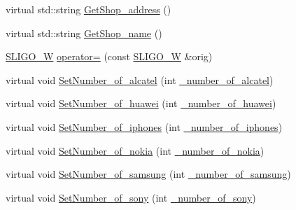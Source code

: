 \begin{DoxyCompactItemize}
virtual std\+::string \hyperlink{class_s_l_i_g_o___w_a66a2315d531231e34c5056e9bc917797_a66a2315d531231e34c5056e9bc917797}{Get\+Shop\+\_\+address} ()
\item 
virtual std\+::string \hyperlink{class_s_l_i_g_o___w_ae788518e30d9d311eb28f37da932367a_ae788518e30d9d311eb28f37da932367a}{Get\+Shop\+\_\+name} ()
\item 
\hyperlink{class_s_l_i_g_o___w}{S\+L\+I\+G\+O\+\_\+W} \hyperlink{class_s_l_i_g_o___w_a64051fdd5b3ebc47b0a74b42eb092c1b_a64051fdd5b3ebc47b0a74b42eb092c1b}{operator=} (const \hyperlink{class_s_l_i_g_o___w}{S\+L\+I\+G\+O\+\_\+W} \&orig)
\item 
virtual void \hyperlink{class_s_l_i_g_o___w_abbd14fe78b2f5881020630842194aa5b_abbd14fe78b2f5881020630842194aa5b}{Set\+Number\+\_\+of\+\_\+alcatel} (int \hyperlink{class_s_l_i_g_o___w_acbf32331901a3fc710c5c97d286b6fcf_acbf32331901a3fc710c5c97d286b6fcf}{\+\_\+number\+\_\+of\+\_\+alcatel})
\item 
virtual void \hyperlink{class_s_l_i_g_o___w_a3f770536e7ae43cba203b36b452bca76_a3f770536e7ae43cba203b36b452bca76}{Set\+Number\+\_\+of\+\_\+huawei} (int \hyperlink{class_s_l_i_g_o___w_af9ca2fb509b7b8ca9f1860ece827501f_af9ca2fb509b7b8ca9f1860ece827501f}{\+\_\+number\+\_\+of\+\_\+huawei})
\item 
virtual void \hyperlink{class_s_l_i_g_o___w_ad2f09386c9305c63a94ab171861eb3a9_ad2f09386c9305c63a94ab171861eb3a9}{Set\+Number\+\_\+of\+\_\+iphones} (int \hyperlink{class_s_l_i_g_o___w_aa958eed564796bb349d15bf2b2e3208d_aa958eed564796bb349d15bf2b2e3208d}{\+\_\+number\+\_\+of\+\_\+iphones})
\item 
virtual void \hyperlink{class_s_l_i_g_o___w_a2b748e4d815e0f2bdb8fb1b0e85b2636_a2b748e4d815e0f2bdb8fb1b0e85b2636}{Set\+Number\+\_\+of\+\_\+nokia} (int \hyperlink{class_s_l_i_g_o___w_a9fe78b9365c145432d58cb947b01111a_a9fe78b9365c145432d58cb947b01111a}{\+\_\+number\+\_\+of\+\_\+nokia})
\item 
virtual void \hyperlink{class_s_l_i_g_o___w_ace5a2d4fae4c84710a648062e60022d2_ace5a2d4fae4c84710a648062e60022d2}{Set\+Number\+\_\+of\+\_\+samsung} (int \hyperlink{class_s_l_i_g_o___w_a2c7845560ec14452132d659eb54f2cec_a2c7845560ec14452132d659eb54f2cec}{\+\_\+number\+\_\+of\+\_\+samsung})
\item 
virtual void \hyperlink{class_s_l_i_g_o___w_abbfe7001333b8c0b57a22f09ec4c3c1d_abbfe7001333b8c0b57a22f09ec4c3c1d}{Set\+Number\+\_\+of\+\_\+sony} (int \hyperlink{class_s_l_i_g_o___w_a0ccf87fe78352e1eac98ed3c85810caa_a0ccf87fe78352e1eac98ed3c85810caa}{\+\_\+number\+\_\+of\+\_\+sony})

\end{DoxyCompactItemize}
